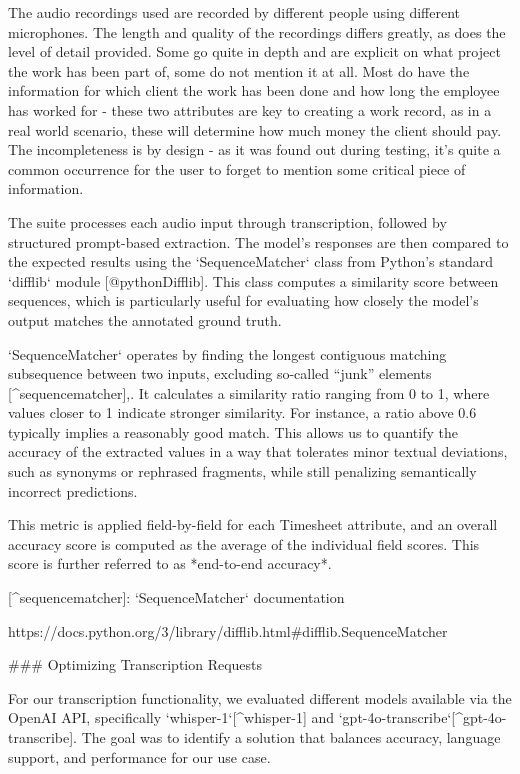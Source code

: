 \documentclass[
  digital,     %
  oneside,     %
  nosansbold,  %
  nocolorbold, %
  lof,         %
  lot,         %
]{fithesis4}
\begin{document}
\begin{markdown}
The audio recordings used are recorded by different people using different microphones. The length and quality of the recordings differs greatly, as does the level of detail provided. Some go quite in depth and are explicit on what project the work has been part of, some do not mention it at all. Most do have the information for which client the work has been done and how long the employee has worked for - these two attributes are key to creating a work record, as in a real world scenario, these will determine how much money the client should pay. The incompleteness is by design - as it was found out during testing, it's quite a common occurrence for the user to forget to mention some critical piece of information.

The suite processes each audio input through transcription, followed by structured prompt-based extraction. The model's responses are then compared to the expected results using the `SequenceMatcher` class from Python’s standard `difflib` module [@pythonDifflib]. This class computes a similarity score between sequences, which is particularly useful for evaluating how closely the model's output matches the annotated ground truth.

`SequenceMatcher` operates by finding the longest contiguous matching subsequence between two inputs, excluding so-called “junk” elements [^sequencematcher],. It calculates a similarity ratio ranging from 0 to 1, where values closer to 1 indicate stronger similarity. For instance, a ratio above 0.6 typically implies a reasonably good match. This allows us to quantify the accuracy of the extracted values in a way that tolerates minor textual deviations, such as synonyms or rephrased fragments, while still penalizing semantically incorrect predictions.

This metric is applied field-by-field for each Timesheet attribute, and an overall accuracy score is computed as the average of the individual field scores. This score is further referred to as *end-to-end accuracy*.

[^sequencematcher]: `SequenceMatcher` documentation
    
    https://docs.python.org/3/library/difflib.html#difflib.SequenceMatcher

### Optimizing Transcription Requests

For our transcription functionality, we evaluated different models available via the OpenAI API, specifically `whisper-1`[^whisper-1] and `gpt-4o-transcribe`[^gpt-4o-transcribe]. The goal was to identify a solution that balances accuracy, language support, and performance for our use case.


\end{markdown}
\end{document}
